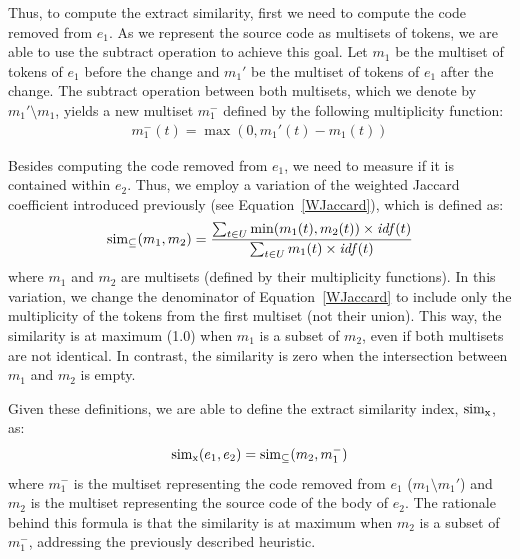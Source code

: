 Thus, to compute the extract similarity, first we need to compute the code removed from $e_1$. As we represent the source code as multisets of tokens, we are able to use the subtract operation to achieve this goal.
Let $m_1$ be the multiset of tokens of $e_1$ before the change and $m_1'$ be the multiset of tokens of $e_1$ after the change.
The subtract operation between both multisets, which we denote by $m_1' \setminus m_1$, yields a new multiset $m_1^-$ defined by the following multiplicity function:
\begin{align}
m_1^-(t) = \max(0, m_1'(t) - m_1(t))
\end{align}

Besides computing the code removed from $e_1$, we need to measure if it is contained within $e_2$. Thus, we employ a variation of the weighted Jaccard coefficient introduced previously (see Equation~\ref{WJaccard}), which is defined as:
\begin{align}
\operatorname{sim_{\subseteq}}(m_1, m_2) = \frac{\sum_{t \in U} \min(m_1(t), m_2(t)) \times \mathit{idf}(t)}
                        {\sum_{t \in U} m_1(t) \times \mathit{idf}(t)}
\end{align}
where $m_1$ and $m_2$ are multisets (defined by their multiplicity functions).
In this variation, we change the denominator of Equation~\ref{WJaccard} to include only the multiplicity of the tokens from the first multiset (not their union).
This way, the similarity is at maximum (1.0) when $m_1$ is a subset of $m_2$, even if both multisets are not identical. In contrast, the similarity is zero when the intersection between $m_1$ and $m_2$ is empty.


Given these definitions, we are able to define the extract similarity index, $\operatorname{sim_{x}}$, as:
\begin{align}
\operatorname{sim_{x}}(e_1, e_2) = \operatorname{sim_{\subseteq}}(m_2, m_1^-)
\end{align}
where $m_1^-$ is the multiset representing the code removed from $e_1$ ($m_1 \setminus m_1'$) and $m_2$ is the multiset representing the source code of the body of $e_2$.
The rationale behind this formula is that the similarity is at maximum
when $m_2$ is a subset of $m_1^-$, addressing the previously described heuristic.





